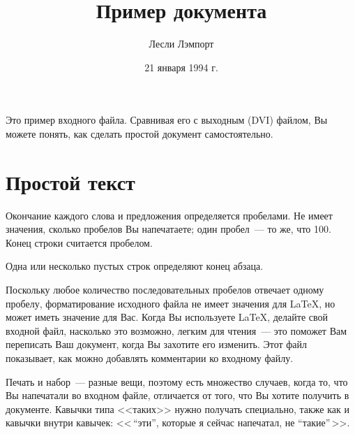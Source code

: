 \documentclass{article}      %
\title{Пример документа}     %
\author{Лесли Лэмпорт}       %
\date{21 января 1994 г.}     %
\begin{document}

\maketitle                   %

Это пример входного файла.  Сравнивая его с выходным (DVI)
файлом, Вы можете понять, как
сделать простой документ самостоятельно.

\tableofcontents

\section{Простой текст}      %

Окончание каждого слова и предложения определяется
  пробелами.    Не имеет значения, сколько пробелов Вы
напечатаете;           один пробел~--- то же, что 100.  Конец
строки считается пробелом.

Одна    или   несколько пустых строк определяют  конец
абзаца.

Поскольку любое количество последовательных пробелов отвечает одному
пробелу, форматирование исходного файла не имеет значения
для
      \LaTeX,                %
но может иметь значение для Вас.  Когда Вы используете \LaTeX, делайте
свой входной файл, насколько это возможно, легким для чтения~---
это поможет Вам переписать Ваш документ, когда Вы захотите его изменить.
Этот файл показывает, как можно добавлять комментарии ко входному файлу.

Печать и набор~--- разные вещи, поэтому есть множество случаев,
когда то, что Вы напечатали во входном файле, отличается от того, что
Вы хотите получить в документе. Кавычки типа
        <<таких>>
нужно получать специально, также как и кавычки внутри кавычек:
        <<\,``эти'',        %
        которые я сейчас
        напечатал,
        не  "`такие"'\,>>.
\end{document}
